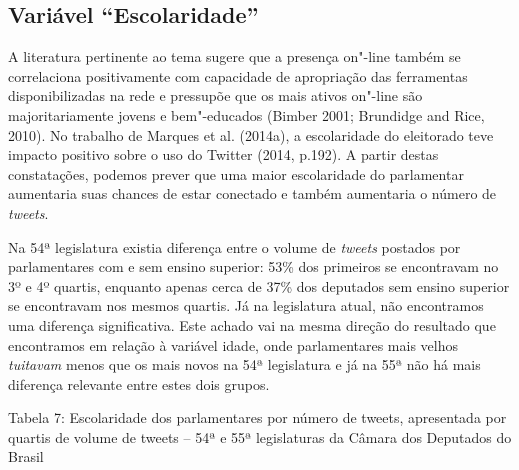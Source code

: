 
\subsection{Variável ``Escolaridade''}

A literatura pertinente ao tema sugere que a presença on"-line também se
correlaciona positivamente com capacidade de apropriação das ferramentas
disponibilizadas na rede e pressupõe que os mais ativos on"-line são
majoritariamente jovens e bem"-educados (Bimber 2001; Brundidge and Rice,
2010). No trabalho de Marques et al. (2014a), a escolaridade do
eleitorado teve impacto positivo sobre o uso do Twitter (2014, p.192). A
partir destas constatações, podemos prever que uma maior escolaridade do
parlamentar aumentaria suas chances de estar conectado e também
aumentaria o número de \emph{tweets}.

Na 54ª legislatura existia diferença entre o volume de \emph{tweets}
postados por parlamentares com e sem ensino superior: 53\% dos primeiros
se encontravam no 3º e 4º quartis, enquanto apenas cerca de 37\% dos
deputados sem ensino superior se encontravam nos mesmos quartis. Já na
legislatura atual, não encontramos uma diferença significativa. Este
achado vai na mesma direção do resultado que encontramos em relação à
variável idade, onde parlamentares mais velhos \emph{tuitavam} menos que
os mais novos na 54ª legislatura e já na 55ª não há mais diferença
relevante entre estes dois grupos.

\begin{center}
Tabela 7: Escolaridade dos parlamentares por número de tweets,
apresentada por quartis de volume de tweets -- 54ª e 55ª legislaturas da
Câmara dos Deputados do Brasil
\end{center}

